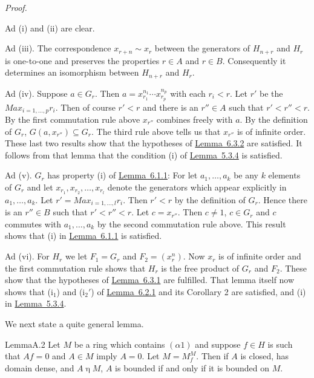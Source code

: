 \documentclass[b5paper,twoside]{article}
\newcommand{\lemref}[2]{\hyperref[#1]{\mbox{Lemma~#2}}}
\theoremstyle{mvnplain}
\renewenvironment{proof}[1][Proof]{%
  \par\addvspace{0.35\baselineskip}%
  \noindent\textit{#1.}\ \normalfont\ignorespaces
}{%
  \par\addvspace{0.35\baselineskip}%
}
\newcommand{\M}{\mathbf M}
\newcommand{\Hilbert}{\mathfrak H}
\def\M{M}%
\def\Hilbert{H}%
\def\operatorname#1{#1}%
\def\mathfrak#1{#1}%
\begin{document}
\begin{proof}
Ad (i) and (ii) are clear.

Ad (iii). The correspondence $x_{r+n}\sim x_r$ between the generators of
$\mathfrak H_{n+r}$ and $\mathfrak H_r$ is one-to-one
and preserves the properties $r\in A$ and $r\in B$. Consequently it
determines an isomorphism between $\mathfrak H_{n+r}$ and $\mathfrak H_r$.

Ad (iv). Suppose $a\in\mathfrak G_r$. Then
$a=x_{r_1}^{n_1}\cdots x_{r_p}^{n_p}$ with each $r_i<r$. Let $r'$ be the
$\operatorname{Max}_{i=1,\ldots,p}r_i$. Then of course $r'<r$ and there is an
$r''\in A$ such that $r'<r''<r$. By the first commutation rule above $x_{r''}$
combines freely with $a$. By the definition of $\mathfrak G_r$,
$\mathfrak G(a,x_{r''})\subseteq\mathfrak G_r$. The third rule above tells us
that $x_{r''}$ is of infinite order. These last two results show that the
hypotheses of \lemref{lem:6.3.2}{6.3.2} are satisfied. It follows from that
lemma that the condition (i) of \lemref{lem:5.3.4}{5.3.4} is satisfied.

Ad (v). $\mathfrak G_r$ has property (i) of
\lemref{lem:6.1.1}{6.1.1}: For let $a_1,\ldots,a_k$ be any $k$ elements of
$\mathfrak G_r$ and let $x_{r_1},x_{r_2},\ldots,x_{r_l}$ denote the generators
which appear explicitly in $a_1,\ldots,a_k$. Let
$r'=\operatorname{Max}_{i=1,\ldots,l}r_i$. Then $r'<r$ by the definition of
$\mathfrak G_r$. Hence there is an $r''\in B$ such that $r'<r''<r$. Let
$c=x_{r''}$. Then $c\ne1$, $c\in\mathfrak G_r$ and $c$ commutes with
$a_1,\ldots,a_k$ by the second commutation rule above. This result shows that
(i) in \lemref{lem:6.1.1}{6.1.1} is satisfied.

Ad (vi). For $\mathfrak H_r$ we let
$\mathfrak F_1=\mathfrak G_r$ and $\mathfrak F_2=(x_r^n)$. Now $x_r$ is of
infinite order and the first commutation rule shows that
$\mathfrak H_r$ is the free product of $\mathfrak G_r$ and
$\mathfrak F_2$. These show that the hypotheses of
\lemref{lem:6.3.1}{6.3.1} are fulfilled. That lemma itself now shows that
(i$_1$) and (i$_2'$) of \lemref{lem:6.2.1}{6.2.1} and its Corollary 2 are
satisfied, and (i) in \lemref{lem:5.3.4}{5.3.4}.
\end{proof}

We next state a quite general lemma.
\begin{namedstatement}{Lemma}{A.2}\label{lem:A.2}
Let $\M$ be a ring which contains $(\alpha1)$ and suppose $f\in\Hilbert$ is
such that $Af=0$ and $A\in\M$ imply $A=0$. Let
$\mathfrak M=\mathfrak M_f^{\M}$. Then if $A$ is closed, has domain dense,
and $A\mathbin{\eta}\M$, $A$ is bounded if and only if it is bounded on
$\mathfrak M$.
\end{namedstatement}
\end{document}
